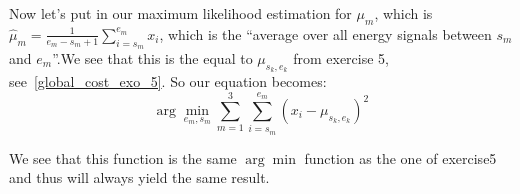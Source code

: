 Now let's put in our maximum likelihood estimation for $\mu_m$, which is $\hat{\mu}_m = \frac{1}{e_m - s_m + 1}\sum_{i=s_m}^{e_m}x_i$, which
is the ``average over all energy signals between $s_m$ and $e_m$''.We see that this is the equal to $\mu_{s_k,e_k}$ from exercise 5, see~\eqref{global_cost_exo_5}. So our equation becomes: 
\[
\arg \min_{e_m,s_m}\sum_{m=1}^{3}\sum_{i=s_m}^{e_m}(x_i - \mu_{s_k,e_k})^2
\]

We see that this function is the same $\arg \min$ function as the one of exercise5 and thus will always yield the same result.

